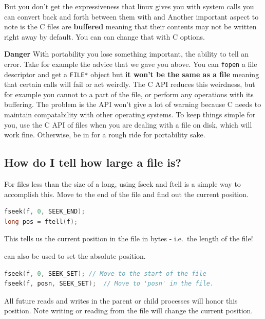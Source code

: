 But you don't get the expressiveness that linux gives you with system calls you can convert back and forth between them with  and  Another important aspect to note is the C files are \textbf{buffered} meaning that their contents may not be written right away by default. You can can change that with C options.

\textbf{Danger} With portability you lose something important, the ability to tell an error. Take for example the advice that we gave you above. You can \texttt{fopen} a file descriptor and get a \texttt{FILE*} object but \textbf{it won't be the same as a file} meaning that certain calls will fail or act weirdly. The C API reduces this weirdness, but for example you cannot  to a part of the file, or perform any operations with its buffering. The problem is the API won't give a lot of warning because C needs to maintain compatability with other operating systems. To keep things simple for you, use the C API of files when you are dealing with a file on disk, which will work fine. Otherwise, be in for a rough ride for portability sake.

\subsection{How do I tell how large a file is?}

For files less than the size of a long, using fseek and ftell is a
simple way to accomplish this. Move to the end of the file and find out the current position.

\begin{lstlisting}[language=C]
fseek(f, 0, SEEK_END);
long pos = ftell(f);
\end{lstlisting}

This tells us the current position in the file in bytes - i.e.~the
length of the file!

 can also be used to set the absolute position.

\begin{lstlisting}[language=C]
fseek(f, 0, SEEK_SET); // Move to the start of the file 
fseek(f, posn, SEEK_SET);  // Move to 'posn' in the file.
\end{lstlisting}

All future reads and writes in the parent or child processes will honor
this position. Note writing or reading from the file will change the
current position.

